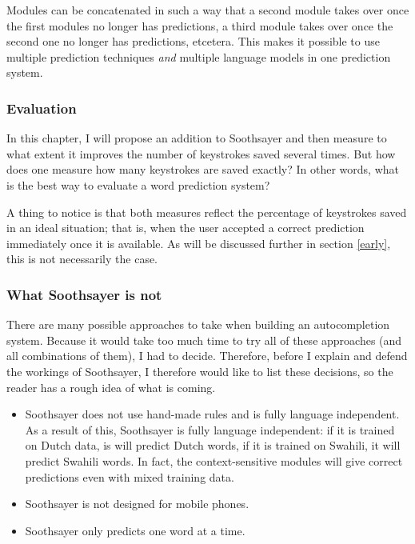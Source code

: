\documentclass[12pt]{article}
\begin{document}
Modules can be concatenated in such a way that a second module takes over once the first modules no longer has predictions, a third module takes over once the second one no longer has predictions, etcetera. This makes it possible to use multiple prediction techniques \emph{and} multiple language models in one prediction system.

\subsubsection{Evaluation}
In this chapter, I will propose an addition to Soothsayer and then measure to what extent it improves the number of keystrokes saved several times. But how does one measure how many keystrokes are saved exactly? In other words, what is the best way to evaluate a word prediction system?



A thing to notice is that both measures reflect the percentage of keystrokes saved in an ideal situation; that is, when the user accepted a correct prediction immediately once it is available. As will be discussed further in section \ref{early}, this is not necessarily the case. 


\subsubsection{What Soothsayer is not}
There are many possible approaches to take when building an autocompletion system. Because it would take too much time to try all of these approaches (and all combinations of them), I had to decide. Therefore, before I explain and defend the workings of Soothsayer, I therefore would like to list these decisions, so the reader has a rough idea of what is coming. 

\begin{itemize}
\item Soothsayer does not use hand-made rules and is fully language independent.
As a result of this, Soothsayer is fully language independent: if it is trained on Dutch data, is will predict Dutch words, if it is trained on Swahili, it will predict Swahili words. In fact, the context-sensitive modules will give correct predictions even with mixed training data.
\item Soothsayer is not designed for mobile phones.

\item Soothsayer only predicts one word at a time.
\end{itemize}
\end{document}
